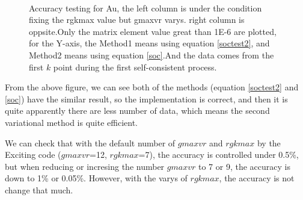 \documentclass[a4paper]{report}
\begin{document}
\begin{figure}[ht!]
\begin{center}
{        }\\%
    \end{center}
    \caption{%
        Accuracy testing for Au, the left column is under the condition fixing the rgkmax value but gmaxvr varys.
        right column is oppsite.Only the matrix element value great than 1E-6 are plotted, for the Y-axis, the Method1 means using equation \ref{soctest2},
        and Method2 means using equation \ref{soc}.And the data comes from the first $k$ point during the first self-consistent process.
     }%
   \label{fig:subfigures}
\end{figure}

\vspace{100cm}
From the above figure, we can see both of the methods (equation \ref{soctest2} and \ref{soc}) have the similar result, so the implementation is correct, and then 
it is quite apparently there are less number of data, which means the second variational method is quite efficient. 

We can check that with the default number of $gmaxvr$ and $rgkmax$ by the Exciting code ($gmaxvr$=12, $rgkmax$=7), 
the accuracy is controlled under 0.5\%, but when reducing or incresing the number $gmaxvr$ to 7 or 9, the accuracy is down to 1\% or 0.05\%. However, with the varys of 
$rgkmax$, the accuracy is not change that much.
\end{document}
